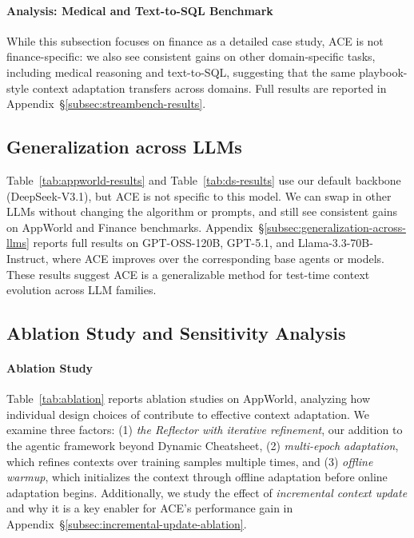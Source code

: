 \paragraph{Analysis: Medical and Text-to-SQL Benchmark} While this subsection focuses on finance as a detailed case study, ACE is not finance-specific: we also see consistent gains on other domain-specific tasks, including medical reasoning and text-to-SQL, suggesting that the same playbook-style context adaptation transfers across domains. 
Full results are reported in Appendix~\S\ref{subsec:streambench-results}.

\subsection{Generalization across LLMs} 
Table~\ref{tab:appworld-results} and Table~\ref{tab:ds-results} use our default backbone (DeepSeek-V3.1), but ACE is not specific to this model. 
We can swap in other LLMs without changing the algorithm or prompts, and still see consistent gains on AppWorld and Finance benchmarks. 
Appendix~\S\ref{subsec:generalization-across-llms} reports full results on GPT-OSS-120B, GPT-5.1, and Llama-3.3-70B-Instruct, where ACE improves over the corresponding base agents or models. 
These results suggest ACE is a generalizable method for test-time context evolution across LLM families.

\subsection{Ablation Study and Sensitivity Analysis}
\label{subsec:results-ablation}

\paragraph{Ablation Study} Table~\ref{tab:ablation} reports ablation studies on AppWorld, analyzing how individual design choices of \name contribute to effective context adaptation. 
We examine three factors: (1) \textit{the Reflector with iterative refinement}, our addition to the agentic framework beyond Dynamic Cheatsheet, (2) \textit{multi-epoch adaptation}, which refines contexts over training samples multiple times, and (3) \textit{offline warmup}, which initializes the context through offline adaptation before online adaptation begins.
Additionally, we study the effect of \emph{incremental context update} and why it is a key enabler for ACE's performance gain in Appendix~\S\ref{subsec:incremental-update-ablation}.

